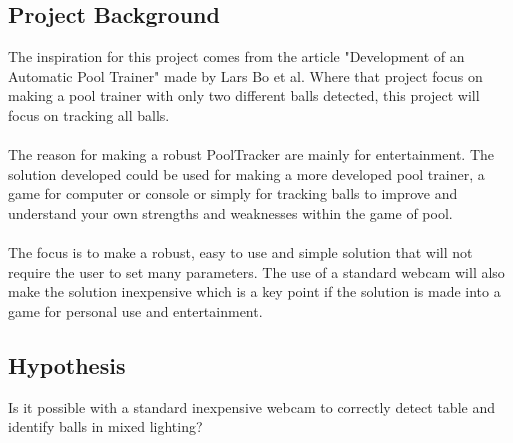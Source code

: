 \subsection{Project Background}
The inspiration for this project comes from the article "Development of an Automatic Pool Trainer"\cite{larsbopool} made by Lars Bo et al. Where that project focus on making a pool trainer with only two different balls detected, this project will focus on tracking all balls. 
\\\\
The reason for making a robust PoolTracker are mainly for entertainment. The solution developed could be used for making a more developed pool trainer, a game for computer or console or simply for tracking balls to improve and understand your own strengths and weaknesses within the game of pool.
\\\\
The focus is to make a robust, easy to use and simple solution that will not require the user to set many parameters. The use of a standard webcam will also make the solution inexpensive which is a key point if the solution is made into a game for personal use and entertainment.

\subsection{Hypothesis}
Is it possible with a standard inexpensive webcam to correctly detect table and identify balls in mixed lighting?